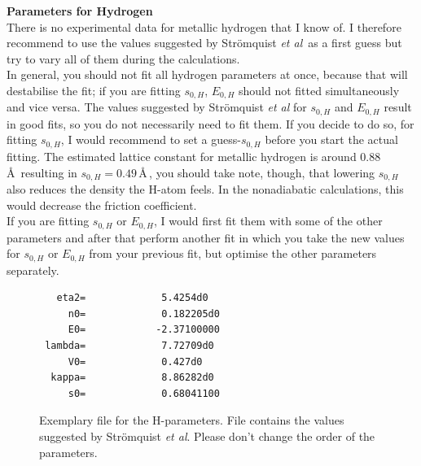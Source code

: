 \documentclass[twoside, 11pt, titlepage, captions=nooneline, a4paper, headsepline]{scrbook}%
\newcommand{\9}{\mathrm}
\newcommand{\0}{\,\mathrm}
\begin{document}
\textbf{Parameters for Hydrogen}\\
There is no experimental data for metallic hydrogen that I know of. I therefore recommend to use the values suggested by Strömquist \emph{et al}\,\cite{strom1998} as a first guess but try to vary all of them during the calculations.\\
In general, you should not fit all hydrogen parameters at once, because that will destabilise the fit; if you are fitting $s_{0,H}$, $E_{0,H}$ should not fitted simultaneously and vice versa. The values suggested by Strömquist \emph{et al} for $s_{0,H}$ and $E_{0,H}$ result in good fits, so you do not necessarily need to fit them. If you decide to do so, for fitting $s_{0,H}$, I would recommend to set a guess-$s_{0,H}$ before you start the actual fitting. The estimated lattice constant for metallic hydrogen is around 0.88\,\AA~resulting in $s_{0,H}=0.49$\,\AA\,\cite{wigner1935}, you should take note, though, that lowering $s_{0,H}$ also reduces the density the H-atom feels. In the nonadiabatic calculations, this would decrease the friction coefficient.\\
If you are fitting $s_{0,H}$ or $E_{0,H}$, I would first fit them with some of the other parameters and after that perform another fit in which you take the new values for $s_{0,H}$ or $E_{0,H}$ from your previous fit, but optimise the other parameters separately.\\
\begin{figure}[t!]
\begin{verbatim}
   eta2=             5.4254d0
     n0=             0.182205d0
     E0=            -2.37100000
 lambda=             7.72709d0
     V0=             0.427d0
  kappa=             8.86282d0
     s0=             0.68041100
\end{verbatim}
\caption{Exemplary file for the H-parameters. File contains the values suggested by Strömquist \emph{et al}. Please don't change the order of the parameters.}
\label{Mdtianfit}
\end{figure}
\end{document}
